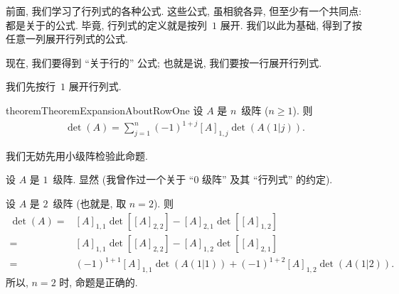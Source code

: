\documentclass[%
    UTF8,%
    fontset=none,%
    punct=kaiming,%
    zihao=-4,%
    a4paper,%
    oneside,%
]{ctexbook}
\let\emph\relax
\renewcommand*{\geq}{\geqslant}
\begin{document}
前面, 我们学习了行列式的各种公式.
这些公式, 虽相貌各异,
但至少有一个共同点:
都是关于\emph{列}的公式.
毕竟, 行列式的定义就是按列~\(1\) 展开.
我们以此为基础,
得到了按任意一列展开行列式的公式.

现在, 我们要得到 ``关于行的'' 公式;
也就是说, 我们要按一行展开行列式.

我们先按行~\(1\) 展开行列式.

\begin{restatable}[]{theorem}{TheoremExpansionAboutRowOne}
    设 \(A\) 是 \(n\)~级阵 (\(n \geq 1\)).
    则
    \begin{align*}
        \det {(A)} = \sum_{j = 1}^{n}
        {(-1)^{1+j} [A]_{1,j} \det {(A(1|j))}}.
    \end{align*}
\end{restatable}

我们无妨先用小级阵检验此命题.

设 \(A\) 是 \(1\)~级阵.
显然
(我曾作过一个关于 ``\(0\) 级阵'' 及其 ``行列式'' 的约定).

设 \(A\) 是 \(2\)~级阵 (也就是, 取 \(n = 2\)).
则
\begin{align*}
    \det {(A)}
    = {} & [A]_{1,1} \det {[[A]_{2,2}]}
    - [A]_{2,1} \det {[[A]_{1,2}]}              \\
    = {} & [A]_{1,1} \det {[[A]_{2,2}]}
    - [A]_{1,2} \det {[[A]_{2,1}]}              \\
    = {} & (-1)^{1+1} [A]_{1,1} \det {(A(1|1))}
    + (-1)^{1+2} [A]_{1,2} \det {(A(1|2))}.
\end{align*}
所以, \(n = 2\) 时, 命题是正确的.
\end{document}
